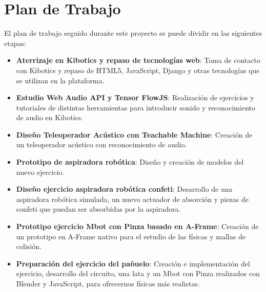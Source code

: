 \section{Plan de Trabajo}
El plan de trabajo seguido durante este proyecto se puede dividir en las siguientes etapas:


\begin{itemize}
    \item \textbf{Aterrizaje en Kibotics y repaso de tecnologías web}: Toma de contacto con Kibotics y repaso de HTML5, JavaScript, Django y otras tecnologías que se utilizan en la plataforma.
    
    \item \textbf{Estudio Web Audio API y Tensor FlowJS}: Realización de ejercicios y tutoriales de distintas herramientas para introducir sonido y reconocimiento de audio en Kibotics.
   
    \item \textbf{Diseño Teleoperador Acústico con Teachable Machine}: Creación de un teleoperador acústico con reconocimiento de audio. 

    \item \textbf{Prototipo de aspiradora robótica}: Diseño y creación de modelos del nuevo ejercicio.
    \item \textbf{Diseño ejercicio aspiradora robótica confeti}: Desarrollo de una aspiradora robótica simulada, un nuevo actuador de absorción y piezas de confeti que puedan ser absorbidas por la aspiradora.
    
    \item \textbf{Prototipo ejercicio Mbot con Pinza basado en A-Frame}: Creación de un prototipo en A-Frame nativo para el estudio de las físicas y mallas de colisión. 
    \item \textbf{Preparación del ejercicio del pañuelo}: Creación e implementación del ejercicio, desarrollo del circuito, una lata y un Mbot con Pinza realizados con Blender y JavaScript, para ofrecernos físicas más realistas.

\end{itemize}

